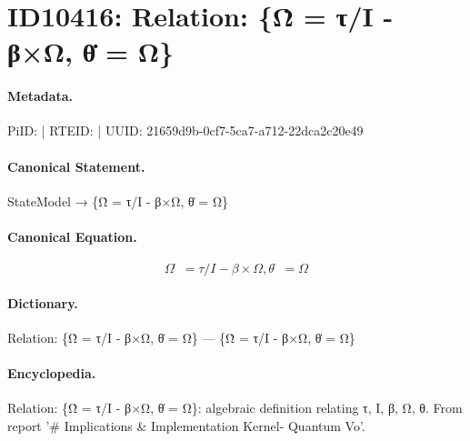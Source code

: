 \section*{ID10416: Relation: \{Ω̇ = τ/I - β×Ω, θ̇ = Ω\}}
\paragraph{Metadata.}
PiID:  | RTEID:  | UUID: 21659d9b-0cf7-5ca7-a712-22dca2c20e49

\paragraph{Canonical Statement.}
StateModel → \{Ω̇ = τ/I - β×Ω, θ̇ = Ω\}

\paragraph{Canonical Equation.}
\[
{Ω̇ = τ/I - β×Ω, θ̇ = Ω}
\]

\paragraph{Dictionary.}
Relation: \{Ω̇ = τ/I - β×Ω, θ̇ = Ω\} — \{Ω̇ = τ/I - β×Ω, θ̇ = Ω\}

\paragraph{Encyclopedia.}
Relation: \{Ω̇ = τ/I - β×Ω, θ̇ = Ω\}: algebraic definition relating τ, I, β, Ω, θ. From report '\# Implications \& Implementation Kernel- Quantum Vo'.
